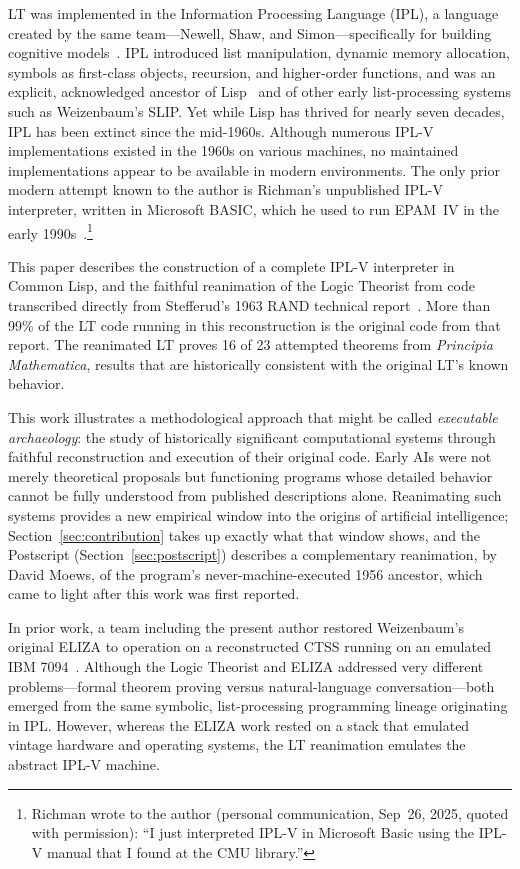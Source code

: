 \documentclass[journal]{IEEEtran}
\begin{document}
LT was implemented in the Information Processing Language (IPL), a
language created by the same team---Newell, Shaw, and
Simon---specifically for building cognitive
models~\cite{newell1964ipl}. IPL introduced list manipulation, dynamic
memory allocation, symbols as first-class objects, recursion, and
higher-order functions, and was an explicit, acknowledged ancestor of
Lisp~\cite{mccarthy1960lisp} and of other early list-processing
systems such as Weizenbaum's SLIP. Yet while Lisp has thrived for
nearly seven decades, IPL has been extinct since the mid-1960s.
Although numerous IPL-V implementations existed in the 1960s on
various machines, no maintained implementations appear to be available
in modern environments. The only prior modern attempt known to the
author is Richman's unpublished IPL-V interpreter, written in
Microsoft BASIC, which he used to run EPAM~IV in the early
1990s~\cite{richman1995epam}.\footnote{Richman wrote to the author
(personal communication, Sep~26, 2025, quoted with permission): ``I
just interpreted IPL-V in Microsoft Basic using the IPL-V manual that
I found at the CMU library.''}

This paper describes the construction of a complete IPL-V interpreter
in Common Lisp, and the faithful reanimation of the Logic Theorist
from code transcribed directly from Stefferud's 1963 RAND technical
report~\cite{stefferud1963lt}. More than 99\% of the LT code running
in this reconstruction is the original code from that report. The
reanimated LT proves 16 of 23 attempted theorems from
\textit{Principia Mathematica}, results that are historically
consistent with the original LT's known behavior.

This work illustrates a methodological approach that might be called
\emph{executable archaeology}: the study of historically significant
computational systems through faithful reconstruction and execution of
their original code. Early AIs were not merely theoretical proposals
but functioning programs whose detailed behavior cannot be fully
understood from published descriptions alone. Reanimating such systems
provides a new empirical window into the origins of artificial
intelligence; Section~\ref{sec:contribution} takes up exactly what
that window shows, and the Postscript
(Section~\ref{sec:postscript}) describes a complementary reanimation,
by David Moews, of the program's never-machine-executed 1956
ancestor, which came to light after this work was first reported.

In prior work, a team including the present author restored
Weizenbaum's original ELIZA to operation on a reconstructed CTSS
running on an emulated IBM 7094~\cite{lane2025eliza}. Although the
Logic Theorist and ELIZA addressed very different problems---formal
theorem proving versus natural-language conversation---both emerged
from the same symbolic, list-processing programming lineage
originating in IPL. However, whereas the ELIZA work rested on a stack
that emulated vintage hardware and operating systems, the LT
reanimation emulates the abstract IPL-V machine.
\end{document}
